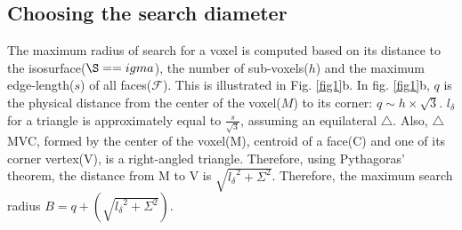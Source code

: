 \documentclass[11pt]{article}
\begin{document}
 \subsection{Choosing the search diameter} 
 The maximum radius of search for a voxel is computed based on its distance to the isosurface($\S==igma$), the number of sub-voxels($h$) and the maximum edge-length($s$) of all faces($\mathcal{F}$). This is illustrated in Fig. \ref{fig1}b. In fig. \ref{fig1}b, $q$ is the physical distance from the center of the voxel($M$) to its corner: $q \sim h \times \sqrt{3}$. $l_\delta$ for a triangle is approximately equal to $\frac{s}{\sqrt{3}}$, assuming an equilateral $\triangle$. Also, $\triangle$ MVC, formed by the center of the voxel(M), centroid of a face(C) and one of its corner vertex(V), is a right-angled triangle. Therefore, using Pythagoras' theorem, the distance from M to V is $\sqrt{{l_\delta}^2 + \Sigma^2}$. Therefore, the maximum search radius $B = q + (\sqrt{{l_\delta}^2 + \Sigma^2})$.
\end{document}

